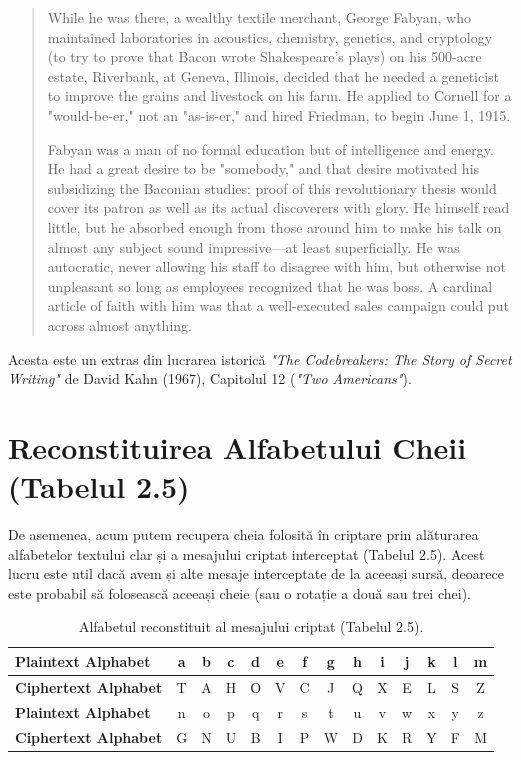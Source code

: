 \documentclass{labreport}
\begin{document}
\begin{quote}
While he was there, a wealthy textile merchant, George Fabyan, who maintained laboratories in acoustics, chemistry, genetics, and cryptology (to try to prove that Bacon wrote Shakespeare's plays) on his 500-acre estate, Riverbank, at Geneva, Illinois, decided that he needed a geneticist to improve the grains and livestock on his farm. He applied to Cornell for a "would-be-er," not an "as-is-er," and hired Friedman, to begin June 1, 1915.

Fabyan was a man of no formal education but of intelligence and energy. He had a great desire to be "somebody," and that desire motivated his subsidizing the Baconian studies: proof of this revolutionary thesis would cover its patron as well as its actual discoverers with glory. He himself read little, but he absorbed enough from those around him to make his talk on almost any subject sound impressive---at least superficially. He was autocratic, never allowing his staff to disagree with him, but otherwise not unpleasant so long as employees recognized that he was boss. A cardinal article of faith with him was that a well-executed sales campaign could put across almost anything.
\end{quote}

\noindent
Acesta este un extras din lucrarea istorică \textit{"The Codebreakers: The Story of Secret Writing"} de David Kahn (1967), Capitolul 12 (\textit{"Two Americans"}).

\section{Reconstituirea Alfabetului Cheii (Tabelul 2.5)}

De asemenea, acum putem recupera cheia folosită în criptare prin alăturarea alfabetelor textului clar și a mesajului criptat interceptat (Tabelul 2.5). Acest lucru este util dacă avem și alte mesaje interceptate de la aceeași sursă, deoarece este probabil să folosească aceeași cheie (sau o rotație a două sau trei chei).

\begin{table}[H]
\centering
\footnotesize
\setlength{\tabcolsep}{3.5pt}
\caption{Alfabetul reconstituit al mesajului criptat (Tabelul 2.5).}
\label{tab:tab25}
\begin{tabular}{|l|c|c|c|c|c|c|c|c|c|c|c|c|c|}
\hline
\textbf{Plaintext Alphabet}  & a & b & c & d & e & f & g & h & i & j & k & l & m \\ \hline
\textbf{Ciphertext Alphabet} & T & A & H & O & V & C & J & Q & X & E & L & S & Z \\ \hline \hline
\textbf{Plaintext Alphabet}  & n & o & p & q & r & s & t & u & v & w & x & y & z \\ \hline
\textbf{Ciphertext Alphabet} & G & N & U & B & I & P & W & D & K & R & Y & F & M \\ \hline
\end{tabular}
\end{table}
\end{document}
